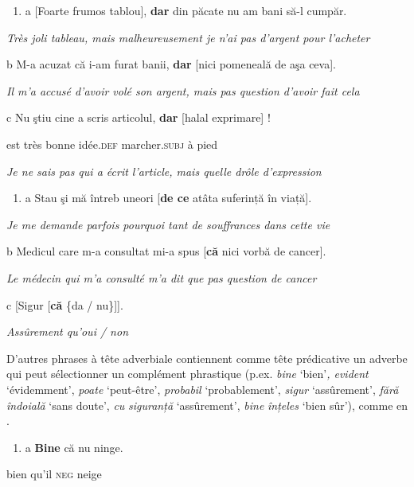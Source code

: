 \begin{enumerate}
\item \label{bkm:Ref283996605}a  [Foarte frumos tablou], \textbf{dar} din păcate nu am bani să-l cumpăr. 


\end{enumerate}
{\itshape
Très joli tableau, mais malheureusement je n'ai pas d'argent pour l'acheter}

b  M-a acuzat că i-am furat banii, \textbf{dar} [nici pomeneală de aşa ceva]. 

{\itshape
Il m'a accusé d'avoir volé son argent, mais pas question d'avoir fait cela}

c  Nu ştiu cine a scris articolul, \textbf{dar} [halal exprimare] !

  est très bonne idée.\textsc{def} marcher.\textsc{subj} à pied

{\itshape
Je ne sais pas qui a écrit l'article, mais quelle drôle d'expression}


\begin{enumerate}
\item \label{bkm:Ref283996624}a  Stau şi mă întreb uneori [\textbf{de ce} atâta suferință în viață].


\end{enumerate}
{\itshape
Je me demande parfois pourquoi tant de souffrances dans cette vie}

b  Medicul care m-a consultat mi-a spus [\textbf{că} nici vorbă de cancer]. 

{\itshape
Le médecin qui m'a consulté m'a dit que pas question de cancer} 

c  [Sigur [\textbf{că} \{da / nu\}]].

{\itshape
Assûrement qu'oui / non}

D'autres phrases à tête adverbiale contiennent comme tête prédicative un adverbe qui peut sélectionner un complément phrastique (p.ex. \textit{bine} `bien'\textit{, evident} `évidemment', \textit{poate} `peut-être', \textit{probabil} `probablement', \textit{sigur} `assûrement', \textit{fără} \textit{îndoială} `sans doute', \textit{cu} \textit{siguranță} `assûrement', \textit{bine} \textit{înțeles} `bien sûr'), comme en .


\begin{enumerate}
\item \label{bkm:Ref302655172}a  \textbf{Bine} că nu ninge.


\end{enumerate}
  bien qu'il \textsc{neg} neige 

